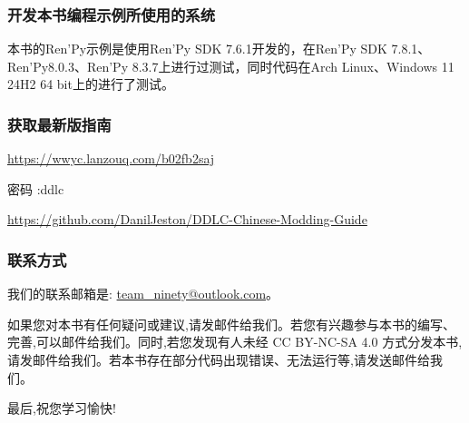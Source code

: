 \documentclass[../Main.tex]{subfiles}
\begin{document}
\subsubsection*{开发本书编程示例所使用的系统}
本书的Ren'Py示例是使用Ren'Py SDK 7.6.1开发的，在Ren'Py SDK 7.8.1、Ren'Py8.0.3、Ren'Py 8.3.7上进行过测试，同时代码在Arch Linux、Windows 11 24H2 64 bit上的进行了测试。

\subsubsection*{获取最新版指南}
\url{https://wwyc.lanzouq.com/b02fb2saj}

密码 :ddlc

\url{https://github.com/DanilJeston/DDLC-Chinese-Modding-Guide}

\subsubsection*{联系方式}
我们的联系邮箱是: \url{team_ninety@outlook.com}。
\newline\newline\par
如果您对本书有任何疑问或建议,请发邮件给我们。若您有兴趣参与本书的编写、完善,可以邮件给我们。同时,若您发现有人未经 CC BY-NC-SA 4.0 方式分发本书,请发邮件给我们。若本书存在部分代码出现错误、无法运行等,请发送邮件给我们。

最后,祝您学习愉快!
\end{document}
